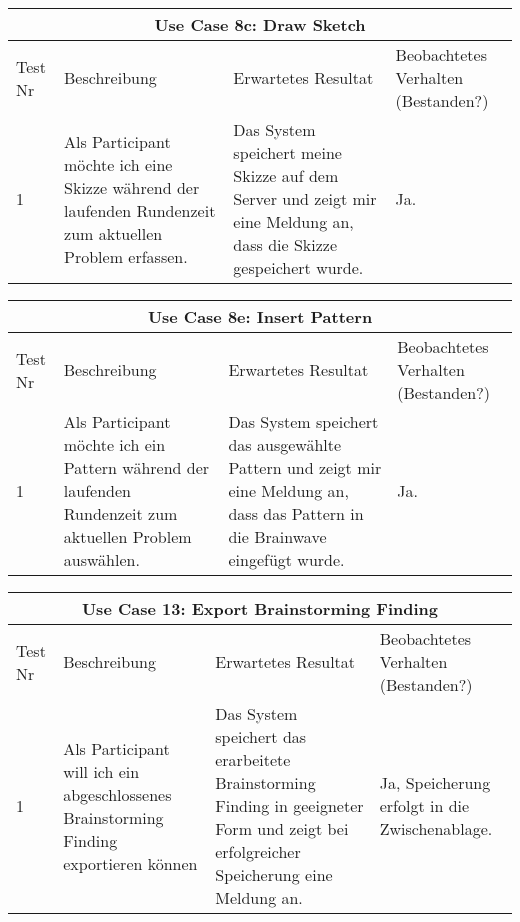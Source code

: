 \renewcommand{\arraystretch}{1.35}
\begin{center}
	\begin{longtable}{| p{1cm} | p{4cm} | p{5cm} | p{3cm} |}
		\hline
		\multicolumn{4}{|c|}{\textbf{Use Case 8c: Draw Sketch}}\\
		\hline\hline
		Test Nr & Beschreibung & Erwartetes Resultat & Beo\-bach\-te\-tes Verhalten (Bestanden?) \\
		\hline
		1 & Als Participant möchte ich eine Skizze während der laufenden Rundenzeit zum aktuellen Problem erfassen. & Das System speichert meine Skizze auf dem Server und zeigt mir eine Meldung an, dass die Skizze gespeichert wurde. & Ja. \\
		\hline
	\end{longtable}
\end{center}

\renewcommand{\arraystretch}{1.35}
\begin{center}
	\begin{longtable}{| p{1cm} | p{4cm} | p{5cm} | p{3cm} |}
		\hline
		\multicolumn{4}{|c|}{\textbf{Use Case 8e: Insert Pattern}}\\
		\hline\hline
		Test Nr & Beschreibung & Erwartetes Resultat & Beo\-bach\-te\-tes Verhalten (Bestanden?) \\
		\hline
		1 & Als Participant möchte ich ein Pattern während der laufenden Rundenzeit zum aktuellen Problem auswählen. & Das System speichert das ausgewählte Pattern und zeigt mir eine Meldung an, dass das Pattern in die Brainwave eingefügt wurde. & Ja. \\
		\hline
	\end{longtable}
\end{center}

\renewcommand{\arraystretch}{1.35}
\begin{center}
	\begin{longtable}{| p{1cm} | p{4cm} | p{5cm} | p{3cm} |}
		\hline
		\multicolumn{4}{|c|}{\textbf{Use Case 13: Export Brainstorming Finding}}\\
		\hline\hline
		Test Nr & Beschreibung & Erwartetes Resultat & Beo\-bach\-te\-tes Verhalten (Bestanden?) \\
		\hline
		1 & Als Participant will ich ein ab\-ge\-schlos\-sen\-es Brainstorming Finding exportieren können & Das System speichert das erarbeitete Brainstorming Finding in geeigneter Form und zeigt bei erfolgreicher Speicherung eine Meldung an. & Ja, Speicherung erfolgt in die Zwischenablage. \\
		\hline
	\end{longtable}
\end{center}

